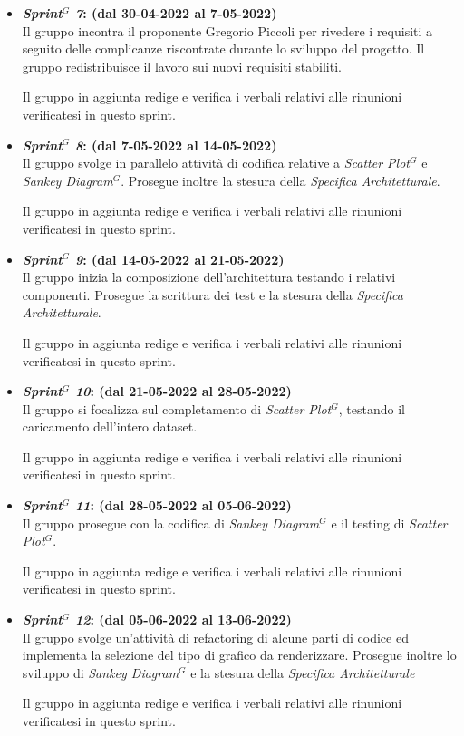 \begin{itemize}
    \item \textbf{\textit{Sprint$^G$  7}: (dal 30-04-2022 al 7-05-2022)}\\
    Il gruppo incontra il proponente Gregorio Piccoli per rivedere i requisiti a seguito delle complicanze riscontrate durante lo sviluppo del progetto.
    Il gruppo redistribuisce il lavoro sui nuovi requisiti stabiliti.

    Il gruppo in aggiunta redige e verifica i verbali relativi alle rinunioni verificatesi in questo sprint.

    \item \textbf{\textit{Sprint$^G$  8}: (dal 7-05-2022 al 14-05-2022)}\\
    Il gruppo svolge in parallelo attività di codifica relative a \textit{Scatter Plot}$^G$ e \textit{Sankey Diagram}$^G$. 
    Prosegue inoltre la stesura della \textit{Specifica Architetturale}.

    Il gruppo in aggiunta redige e verifica i verbali relativi alle rinunioni verificatesi in questo sprint.

    \item \textbf{\textit{Sprint$^G$  9}: (dal 14-05-2022 al 21-05-2022)}\\
    Il gruppo inizia la composizione dell'architettura testando i relativi componenti. Prosegue la scrittura dei test e la stesura della \textit{Specifica Architetturale}.

    Il gruppo in aggiunta redige e verifica i verbali relativi alle rinunioni verificatesi in questo sprint.
    \item \textbf{\textit{Sprint$^G$  10}: (dal 21-05-2022 al 28-05-2022)}\\
    Il gruppo si focalizza sul completamento di \textit{Scatter Plot}$^G$, testando il caricamento dell'intero dataset. 

    Il gruppo in aggiunta redige e verifica i verbali relativi alle rinunioni verificatesi in questo sprint.

    \item \textbf{\textit{Sprint$^G$  11}: (dal 28-05-2022 al 05-06-2022)}\\
    Il gruppo prosegue con la codifica di \textit{Sankey Diagram}$^G$ e il testing di \textit{Scatter Plot}$^G$. 
    
    Il gruppo in aggiunta redige e verifica i verbali relativi alle rinunioni verificatesi in questo sprint.

    \item \textbf{\textit{Sprint$^G$  12}: (dal 05-06-2022 al 13-06-2022)}\\
    Il gruppo svolge un'attività di refactoring di alcune parti di codice ed implementa la selezione del tipo di grafico da renderizzare.
    Prosegue inoltre lo sviluppo di \textit{Sankey Diagram}$^G$ e la stesura della \textit{Specifica Architetturale}
    
    Il gruppo in aggiunta redige e verifica i verbali relativi alle rinunioni verificatesi in questo sprint.

\end{itemize}

